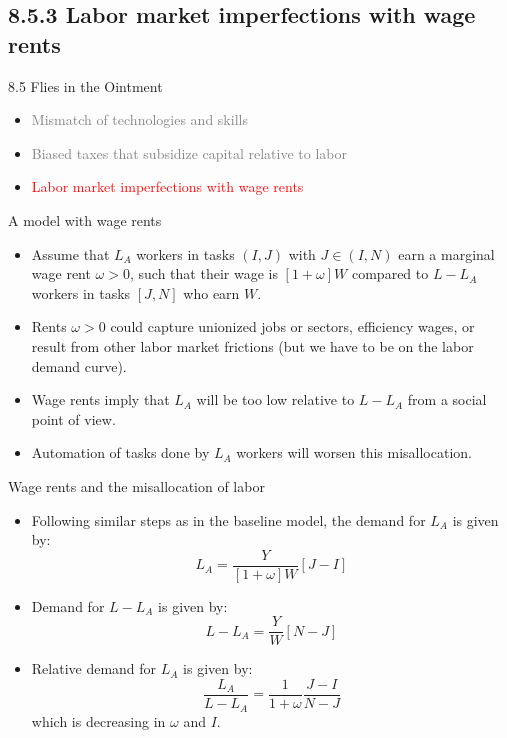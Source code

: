 \documentclass[notes=show]{beamer}
\begin{document}
\subsection{8.5.3 Labor market imperfections with wage rents}

\begin{frame}{8.5 Flies in the Ointment}
\begin{itemize}
\item[\textcolor{gray}{8.5.1}] \textcolor{gray}{Mismatch of technologies and skills} \bigskip
\item[\textcolor{gray}{8.5.2}] \textcolor{gray}{Biased taxes that subsidize capital relative to labor} \bigskip
\item[\textcolor{red}{8.5.3}] \textcolor{red}{Labor market imperfections with wage rents}
\end{itemize}
\end{frame}

\begin{frame}{A model with wage rents}
\begin{itemize}
\item Assume that $L_{A}$ workers in tasks $(I,J)$ with $J \in (I,N)$ earn a marginal wage rent $\omega >0$, such that their wage is $[1+ \omega]W$ compared to $L-L_{A}$ workers in tasks $[J,N]$ who earn $W$. \medskip
\item Rents $\omega>0$ could capture unionized jobs or sectors, efficiency wages, or result from other labor market frictions (but we have to be on the labor demand curve). \medskip
\item Wage rents imply that $L_{A}$ will be too low relative to $L-L_{A}$ from a social point of view. \medskip
\item Automation of tasks done by $L_{A}$ workers will worsen this misallocation. 
\end{itemize}
\end{frame}

\begin{frame}{Wage rents and the misallocation of labor}
\begin{itemize}
\item Following similar steps as in the baseline model, the demand for $L_{A}$ is given by:
\[
L_{A} = \frac{Y}{[1+\omega ]W}[J-I]
\]
\item Demand for $L-L_{A}$ is given by:
\[
L-L_{A} = \frac{Y}{W}[N-J]
\]
\item Relative demand for $L_{A}$ is given by:
\[
\frac{L_{A}}{L-L_{A}} = \frac{1}{1+ \omega } \frac{J-I}{N-J}
\]
which is decreasing in $\omega$ and $I$.
\end{itemize}
\end{frame}
\end{document}

